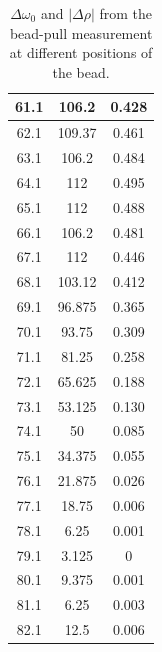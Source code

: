 \documentclass[a4paper]{report}
\numberwithin{equation}{section}
\begin{document}
\begin{table}[!ht]
\begin{tabular}{|c|c|c|}
        61.1 & 106.2 & 0.428 \\ \hline
        62.1 & 109.37 & 0.461 \\ \hline
        63.1 & 106.2 & 0.484 \\ \hline
        64.1 & 112 & 0.495 \\ \hline
        65.1 & 112 & 0.488 \\ \hline
        66.1 & 106.2 & 0.481 \\ \hline
        67.1 & 112 & 0.446 \\ \hline
        68.1 & 103.12 & 0.412 \\ \hline
        69.1 & 96.875 & 0.365 \\ \hline
        70.1 & 93.75 & 0.309 \\ \hline
        71.1 & 81.25 & 0.258 \\ \hline
        72.1 & 65.625 & 0.188 \\ \hline
        73.1 & 53.125 & 0.130 \\ \hline
        74.1 & 50 & 0.085 \\ \hline
        75.1 & 34.375 & 0.055 \\ \hline
        76.1 & 21.875 & 0.026 \\ \hline
        77.1 & 18.75 & 0.006 \\ \hline
        78.1 & 6.25 & 0.001 \\ \hline
        79.1 & 3.125 & 0 \\ \hline
        80.1 & 9.375 & 0.001 \\ \hline
        81.1 & 6.25 & 0.003 \\ \hline
        82.1 & 12.5 & 0.006 \\ \hline
    \end{tabular}
	\caption{$\Delta\omega_0$ and $|\Delta \rho|$ from the bead-pull measurement at different positions of the bead.}
\end{table}

\printbibliography
\end{document}

